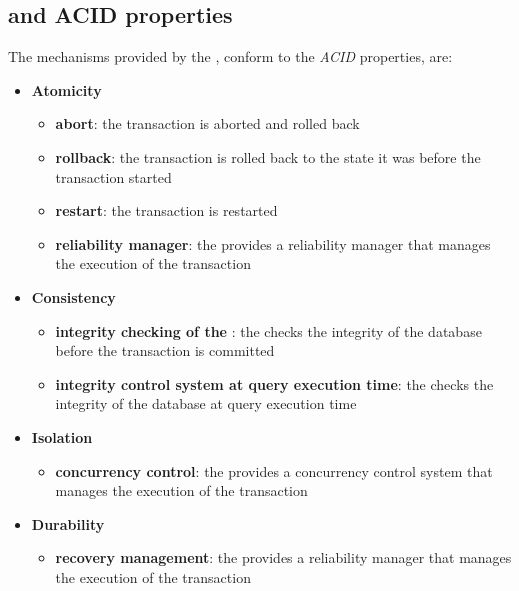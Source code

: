 \documentclass[english]{article}
\begin{document}
\newpage

\subsection{\dbms and ACID properties}

The mechanisms provided by the \dbms, conform to the \textit{ACID} properties, are:

\begin{itemize}
  \item \textbf{Atomicity}
        \begin{itemize}
          \item \textbf{abort}: the transaction is aborted and rolled back
          \item \textbf{rollback}: the transaction is rolled back to the state it was before the transaction started
          \item \textbf{restart}: the transaction is restarted
          \item \textbf{reliability manager}: the \dbms provides a reliability manager that manages the execution of the transaction
        \end{itemize}
  \item \textbf{Consistency}
        \begin{itemize}
          \item \textbf{integrity checking of the \dbms}: the \dbms checks the integrity of the database before the transaction is committed
          \item \textbf{integrity control system at query execution time}: the \dbms checks the integrity of the database at query execution time
        \end{itemize}
  \item \textbf{Isolation}
        \begin{itemize}
          \item \textbf{concurrency control}: the \dbms provides a concurrency control system that manages the execution of the transaction
        \end{itemize}
  \item \textbf{Durability}
        \begin{itemize}
          \item \textbf{recovery management}: the \dbms provides a reliability manager that manages the execution of the transaction
        \end{itemize}
\end{itemize}
\end{document}
